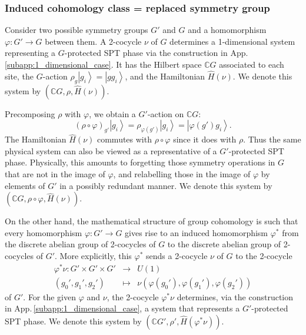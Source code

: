 \documentclass[sort&compress]{elsarticle}
\theoremstyle{theoremstyle}
\theoremstyle{framedtheoremstyle}
\theoremstyle{definitionstyle}
\theoremstyle{definitionstyle}
\theoremstyle{definitionstyle}
\theoremstyle{definitionstyle}
\theoremstyle{nameddefinitionstyle}
\theoremstyle{framednameddefinitionstyle}
\theoremstyle{proofstyle}
\theoremstyle{definitionstyle}
\newcommand{\fromto}{\rightarrow}
\newcommand{\CCC}{\mathbb{C}}
\newcommand{\paren}[1]{\left( #1 \right)}
\newcommand{\ket}[1]{\left|#1\right\rangle}
\begin{document}
\begin{appendices}
\subsubsection{Induced cohomology class = replaced symmetry group \label{subsubapp:induced_cohomology_class_replaced_symmetry_group}}

Consider two possible symmetry groups $G'$ and $G$ and a homomorphism $\varphi: G' \fromto G$ between them. 
A 2-cocycle $\nu$ of $G$ determines a 1-dimensional system representing a $G$-protected SPT phase via the construction in App.\,\ref{subapp:1_dimensional_case}. It has the Hilbert space $\CCC G$ associated to each site, the $G$-action $\rho_g \ket{g_i} = \ket{gg_i}$, and the Hamiltonian $\hat H(\nu)$. We denote this system by $\paren{\CCC G, \rho, \hat H(\nu)}$.

Precomposing $\rho$ with $\varphi$, we obtain a $G'$-action on $\CCC G$:
\begin{equation}
\paren{\rho \circ \varphi}_{g'} \ket{g_i} = \rho_{\varphi(g')} \ket{g_i} = \ket{ \varphi(g') g_i }.
\end{equation}
The Hamiltonian $\hat H(\nu)$ commutes with $\rho\circ \varphi$ since it does with $\rho$. Thus the same physical system can also be viewed as a representative of a $G'$-protected SPT phase. Physically, this amounts to forgetting those symmetry operations in $G$ that are not in the image of $\varphi$, and relabelling those in the image of $\varphi$ by elements of $G'$ in a possibly redundant manner. We denote this system by $\paren{\CCC G, \rho\circ\varphi, \hat H(\nu)}$.

On the other hand, the mathematical structure of group cohomology is such that every homomorphism $\varphi:G'\fromto G$ gives rise to an induced homomorphism $\varphi^*$ from the discrete abelian group of 2-cocycles of $G$ to the discrete abelian group of 2-cocycles of $G'$. More explicitly, this $\varphi^*$ sends a 2-cocycle $\nu$ of $G$ to the 2-cocycle
\begin{eqnarray}
\varphi^* \nu: G' \times G' \times G' &\fromto& U(1) \nonumber\\
(g_0', g_1', g_2') &\mapsto& \nu\paren{\varphi(g_0'), \varphi(g_1'), \varphi(g_2')}
\end{eqnarray}
of $G'$. For the given $\varphi$ and $\nu$, the 2-cocycle $\varphi^* \nu$ determines, via the construction in App.\,\ref{subapp:1_dimensional_case}, a system that represents a $G'$-protected SPT phase. We denote this system by $\paren{\CCC G', \rho', \hat H(\varphi^* \nu)}$.


\end{appendices}
\end{document}
